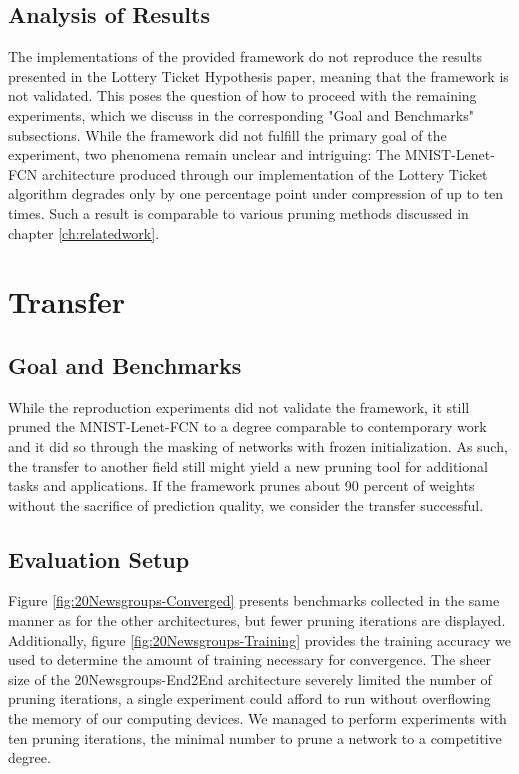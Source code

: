 \subsection*{Analysis of Results}
The implementations of the provided framework do not reproduce the results presented in the Lottery Ticket Hypothesis paper, meaning that the framework is not validated. This poses the question of how to proceed with the remaining experiments, which we discuss in the corresponding "Goal and Benchmarks" subsections.
While the framework did not fulfill the primary goal of the experiment, two phenomena remain unclear and intriguing:
The MNIST-Lenet-FCN architecture produced through our implementation of the Lottery Ticket algorithm degrades only by one percentage point under compression of up to ten times. Such a result is comparable to various pruning methods discussed in chapter \ref{ch:relatedwork}. 


\section{Transfer}
\subsection*{Goal and Benchmarks}
While the reproduction experiments did not validate the framework, it still pruned the MNIST-Lenet-FCN to a degree comparable to contemporary work and it did so through the masking of networks with frozen initialization. As such, the transfer to another field still might yield a new pruning tool for additional tasks and applications. If the framework prunes about 90 percent of weights without the sacrifice of prediction quality, we consider the transfer successful.
\subsection*{Evaluation Setup}
Figure \ref{fig:20Newsgroups-Converged} presents benchmarks collected in the same manner as for the other architectures, but fewer pruning iterations are displayed. Additionally, figure \ref{fig:20Newsgroups-Training} provides the training accuracy we used to determine the amount of training necessary for convergence. The sheer size of the 20Newsgroups-End2End architecture severely limited the number of pruning iterations, a single experiment could afford to run without overflowing the memory of our computing devices. We managed to perform experiments with ten pruning iterations, the minimal number to prune a network to a competitive degree. 
